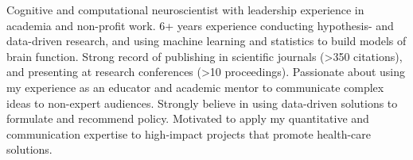 

\begin{cvparagraph}

Cognitive and computational neuroscientist with leadership experience in academia and non-profit work. 6+ years experience conducting hypothesis- and data-driven research, and using machine learning and statistics to build models of brain function. Strong record of publishing in scientific journals (>350 citations), and presenting at research conferences (>10 proceedings). Passionate about using my experience as an educator and academic mentor to communicate complex ideas to non-expert audiences. Strongly believe in using data-driven solutions to formulate and recommend policy. Motivated to apply my quantitative and communication expertise to high-impact projects that promote health-care solutions. 

\end{cvparagraph}
